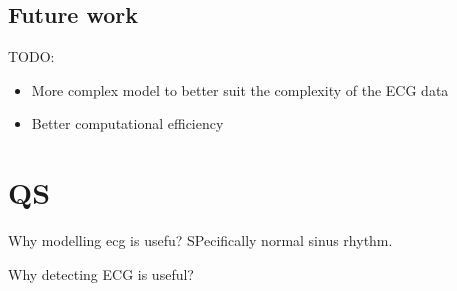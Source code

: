 \documentclass{mldsmsc}
\begin{document}
\section{Future work}

TODO:
\begin{itemize}
    \item More complex model to better suit the complexity of the ECG data
    \item Better computational efficiency
\end{itemize}

\chapter{QS}

Why modelling ecg is usefu? SPecifically normal sinus rhythm.

Why detecting ECG is useful?

\clearpage
\renewcommand*{\thepage}{A\arabic{page}}

%
%




\end{document}

